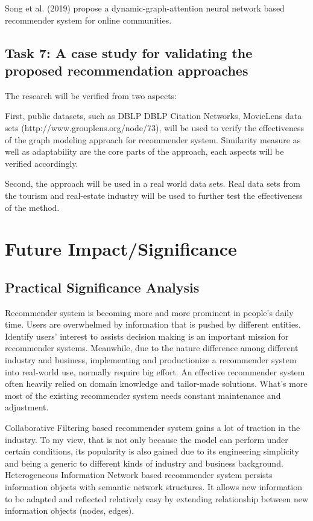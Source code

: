 \documentclass[12pt,a4 paper,title page]{article}
\begin{document}
Song et al. (2019) propose a dynamic-graph-attention neural network based recommender system for online communities.



\subsection{Task 7:  A case study for validating the proposed recommendation approaches}

The research will be verified from two aspects: 

First, public datasets, such as DBLP DBLP Citation Networks, MovieLens data sets (http://www.grouplens.org/node/73), will be used to verify the effectiveness of the graph modeling approach for recommender system. Similarity measure as well as adaptability are the core parts of the approach, each aspects will be verified accordingly. 

Second, the approach will be used in a real world data sets. Real data sets from the tourism and real-estate industry will be used to further test the effectiveness of the method.




\section{Future Impact/Significance}

\subsection{Practical Significance Analysis}
Recommender system is becoming more and more prominent in people's daily time. Users are overwhelmed by information that is pushed by different entities. Identify users' interest to assists decision making is an important mission for recommender systems. Meanwhile, due to the nature difference among different industry and business, implementing and productionize a recommender system into real-world use, normally require big effort. An effective recommender system often heavily relied on domain knowledge and tailor-made solutions. What's more most of the existing recommender system needs constant maintenance and adjustment.  

Collaborative Filtering based recommender system gains a lot of traction in the industry. To my view, that is not only because the model can perform under certain conditions, its popularity is also gained due to its engineering simplicity and being a generic to different kinds of industry and business background. Heterogeneous Information Network based recommender system persists information objects with semantic network structures. It allows new information to be adapted and reflected relatively easy by extending relationship between new information objects (nodes, edges).  
\end{document}
